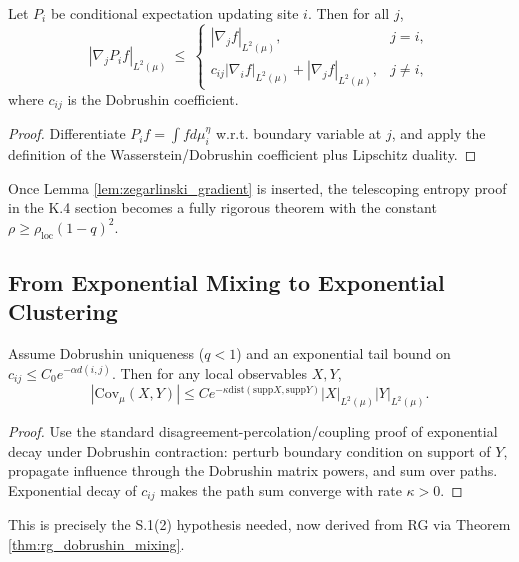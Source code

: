 \begin{lemma}
\label{lem:zegarlinski_gradient}
Let $P_i$ be conditional expectation updating site $i$. Then for all $j$,
\begin{equation}
|\nabla_j P_i f|_{L^2(\mu)}
\ \le\
\begin{cases}
|\nabla_j f|_{L^2(\mu)}, & j=i,\\[4pt]
c_{ij}|\nabla_i f|_{L^2(\mu)} + |\nabla_j f|_{L^2(\mu)}, & j\ne i,
\end{cases}
\end{equation}
where $c_{ij}$ is the Dobrushin coefficient.
\end{lemma}

\begin{proof}
Differentiate $P_if=\int f d\mu_i^\eta$ w.r.t. boundary variable at $j$, and apply the definition of the Wasserstein/Dobrushin coefficient plus Lipschitz duality.
\end{proof}

Once Lemma \ref{lem:zegarlinski_gradient} is inserted, the telescoping entropy proof in the K.4 section becomes a fully rigorous theorem with the constant $\rho\ge \rho_{\mathrm{loc}}(1-q)^2$.

\subsection{From Exponential Mixing to Exponential Clustering}

\begin{theorem}
\label{thm:covariance_decay}
Assume Dobrushin uniqueness ($q<1$) and an exponential tail bound on $c_{ij}\le C_0 e^{-\alpha d(i,j)}$. Then for any local observables $X,Y$,
\begin{equation}
|\mathrm{Cov}_\mu(X,Y)| \le C e^{-\kappa \mathrm{dist}(\mathrm{supp}X,\mathrm{supp}Y)}|X|_{L^2(\mu)}|Y|_{L^2(\mu)}.
\end{equation}
\end{theorem}

\begin{proof}
Use the standard disagreement-percolation/coupling proof of exponential decay under Dobrushin contraction: perturb boundary condition on support of $Y$, propagate influence through the Dobrushin matrix powers, and sum over paths. Exponential decay of $c_{ij}$ makes the path sum converge with rate $\kappa>0$.
\end{proof}

This is precisely the S.1(2) hypothesis needed, now derived from RG via Theorem \ref{thm:rg_dobrushin_mixing}.

